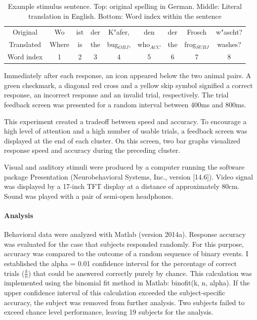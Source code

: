 \vspace{5mm}
\begin{table}[htb]
\begin{center}
\begin{tabular}{c|cccccccc}
Original & Wo & ist & der & K"afer, & den & der & Frosch & w"ascht?\\
Translated & Where & is & the & bug$_{OBJ}$, & who$_{ACC}$ & the & frog$_{SUBJ}$ & washes?\\
Word index & 1 & 2 & 3 & 4 & 5 & 6 & 7 & 8
\end{tabular}
\caption{\label{2.sentences} Example stimulus sentence. Top: original spelling in German. Middle: Literal translation in English. Bottom: Word index within the sentence}
\end{center}
\end{table}
\vspace{5mm}

Immediately after each response, an icon appeared below the two animal pairs.
A green checkmark, a diagonal red cross and a yellow skip symbol signified a correct response, an incorrect response and an invalid trial, respectively.
The trial feedback screen was presented for a random interval between 400ms and 800ms.

This experiment created a tradeoff between speed and accuracy.
To encourage a high level of attention and a high number of usable trials, a feedback screen was displayed at the end of each cluster.
On this screen, two bar graphs visualized response speed and accuracy during the preceding cluster.

Visual and auditory stimuli were produced by a computer running the software package Presentation (Neurobehavioral Systems, Inc., version [14.6]).
Video signal was displayed by a 17-inch TFT display at a distance of approximately 80cm.
Sound was played with a pair of semi-open headphones.


\paragraph{Analysis}

Behavioral data were analyzed with Matlab (version 2014a).
Response accuracy was evaluated for the case that subjects responded randomly.
For this purpose, accuracy was compared to the outcome of a random sequence of binary events.
I established the alpha = 0.01 confidence interval for the percentage of correct trials ($\frac{k}{n}$) that could be answered correctly purely by chance.
This calculation was implemented using the binomial fit method in Matlab: binofit(k, n, alpha).
If the upper confidence interval of this calculation exceeded the subject-specific accuracy, the subject was removed from further analysis.
Two subjects failed to exceed chance level performance, leaving 19 subjects for the analysis.

